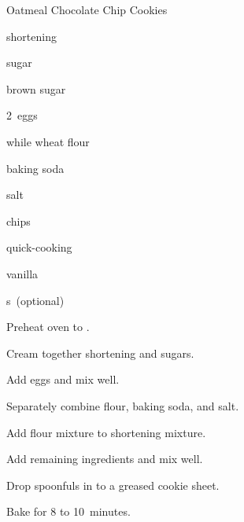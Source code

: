 \begin{recipe}{Oatmeal Chocolate Chip Cookies}{}{}

\begin{ingredients}
\item {} shortening
\item \C{\threequarter} sugar
\item \C{\threequarter} brown sugar
\item 2~eggs
\item \C{1\half} while wheat flour
\item {} baking soda
\item {} salt
\item \C{2\half}  chips
\item {} quick-cooking 
\item {} vanilla
\item {} s~(optional)
\end{ingredients}

\begin{directions}
\item Preheat oven to .
\item Cream together shortening and sugars.
\item Add eggs and mix well.
\item Separately combine flour, baking soda, and salt.
\item Add flour mixture to shortening mixture.
\item Add remaining ingredients and mix well.
\item Drop spoonfuls in to a greased cookie sheet.
\item Bake for 8 to 10~minutes.
\end{directions}

\end{recipe}
